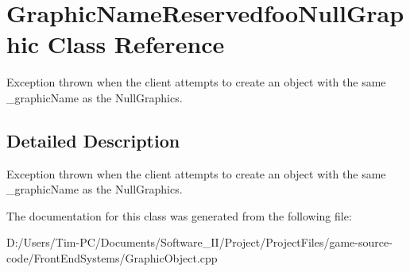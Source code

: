 \hypertarget{class_graphic_name_reservedfoo_null_graphic}{}\section{Graphic\+Name\+Reservedfoo\+Null\+Graphic Class Reference}
\label{class_graphic_name_reservedfoo_null_graphic}


Exception thrown when the client attempts to create an object with the same \+\_\+graphic\+Name as the Null\+Graphics.  




\subsection{Detailed Description}
Exception thrown when the client attempts to create an object with the same \+\_\+graphic\+Name as the Null\+Graphics. 

The documentation for this class was generated from the following file\+:\begin{DoxyCompactItemize}
\item 
D\+:/\+Users/\+Tim-\/\+P\+C/\+Documents/\+Software\+\_\+\+I\+I/\+Project/\+Project\+Files/game-\/source-\/code/\+Front\+End\+Systems/Graphic\+Object.\+cpp\end{DoxyCompactItemize}
